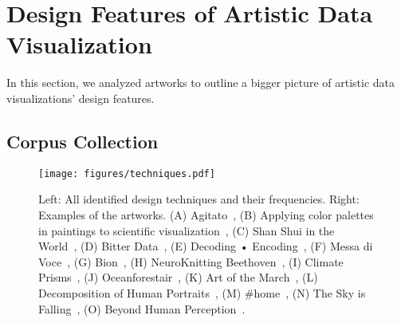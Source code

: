\section{Design Features of Artistic Data Visualization}
\label{sec:space}

In this section, we analyzed \ncorpus artworks to outline a bigger picture of artistic data visualizations' design features. 

\subsection{Corpus Collection}

\begin{figure*}[b]
 \centering
 \texttt{[image: figures/techniques.pdf]}
 \caption{Left: All identified design techniques and their frequencies. Right: Examples of the artworks. (A) Agitato~\cite{agitato}, (B) Applying color palettes in paintings to scientific visualization~\cite{samsel2018art}, (C) Shan Shui in the World~\cite{shi2016shan}, (D) Bitter Data~\cite{li2023bitter}, (E) Decoding • Encoding~\cite{tibetan}, (F) Messa di Voce~\cite{messadivoce}, (G) Bion~\cite{bion}, (H) NeuroKnitting Beethoven~\cite{neuro}, (I) Climate Prisms~\cite{prisms}, (J) Oceanforestair~\cite{oceanforestair}, (K) Art of the March~\cite{protest}, (L) Decomposition of Human Portraits~\cite{face}, (M) \#home~\cite{home}, (N) The Sky is Falling~\cite{sky}, (O) Beyond Human Perception~\cite{plants}.}
 \label{fig:techniques}
 \vspace{-2em}

\end{figure*}

